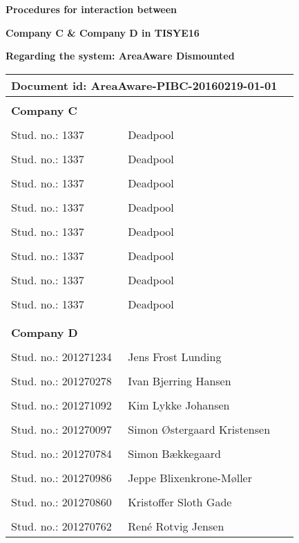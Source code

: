 
\centerline{\Huge\bfseries\color{ThemeColor} Procedures for interaction between} 
\centerline{\Huge\bfseries\color{ThemeColor} Company C \& Company D in TISYE16} 


\vspace{1em}
\centerline{\Large\bfseries\color{BlackColor} Regarding the system: AreaAware Dismounted} 


\begin{center}
   \begin{tabular}{ *{2}l p{6cm} }
   \multicolumn{2}{l}{\textbf{Document id: AreaAware-PIBC-20160219-01-01}} & \\
   \hline
   & & \\
   \textbf{Company C} &  & \\
   & & \\
   Stud. no.: 1337 & Deadpool & \\\hline
   & & \\
   Stud. no.: 1337 & Deadpool & \\\hline
   & & \\
   Stud. no.: 1337 & Deadpool & \\\hline
   & & \\
   Stud. no.: 1337 & Deadpool & \\\hline
   & & \\
   Stud. no.: 1337 & Deadpool & \\\hline
   & & \\
   Stud. no.: 1337 & Deadpool & \\\hline
   & & \\
   Stud. no.: 1337 & Deadpool & \\\hline
   & & \\
   Stud. no.: 1337 & Deadpool & \\\hline
   & & \\
   & & \\
   \textbf{Company D} &  & \\
   & & \\
   Stud. no.: 201271234 & Jens Frost Lunding & \\\hline
   & & \\
   Stud. no.: 201270278 & Ivan Bjerring Hansen & \\\hline
   & & \\
   Stud. no.: 201271092 & Kim Lykke Johansen & \\\hline
   & & \\
   Stud. no.: 201270097 & Simon Østergaard Kristensen & \\\hline
   & & \\
   Stud. no.: 201270784  & Simon Bækkegaard & \\\hline
   & & \\
   Stud. no.: 201270986 & Jeppe Blixenkrone-Møller & \\\hline
   & & \\
   Stud. no.: 201270860 & Kristoffer Sloth Gade & \\\hline
   & & \\
   Stud. no.: 201270762 & René Rotvig Jensen & \\\hline
   \end{tabular}
\end{center}
\thispagestyle{empty} %
\restoregeometry
